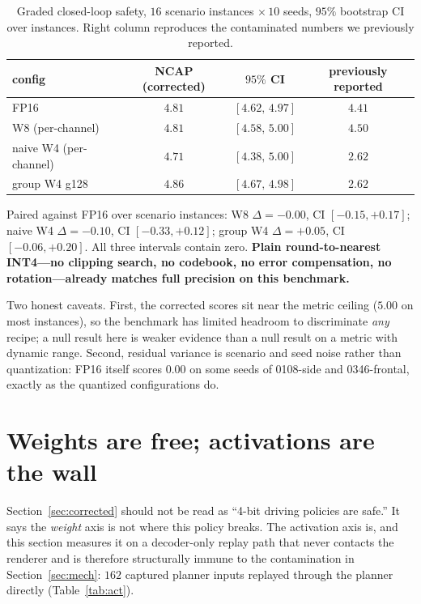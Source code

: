 \documentclass[conference]{IEEEtran}
\begin{document}
\begin{table}[t]\centering
\caption{Graded closed-loop safety, $16$ scenario instances $\times\,10$ seeds, $95\%$ bootstrap CI
over instances. Right column reproduces the contaminated numbers we previously reported.}
\label{tab:corrected}
\begin{tabular}{lccc}
\toprule
config & NCAP (corrected) & $95\%$ CI & previously reported \\
\midrule
FP16 & $4.81$ & $[4.62,\,4.97]$ & $4.41$ \\
W8 (per-channel) & $4.81$ & $[4.58,\,5.00]$ & $4.50$ \\
naive W4 (per-channel) & $\mathbf{4.71}$ & $[4.38,\,5.00]$ & $2.62$ \\
group W4 g128 & $\mathbf{4.86}$ & $[4.67,\,4.98]$ & $2.62$ \\
\bottomrule
\end{tabular}
\end{table}

Paired against FP16 over scenario instances: W8 $\Delta=-0.00$, CI $[-0.15,+0.17]$; naive W4
$\Delta=-0.10$, CI $[-0.33,+0.12]$; group W4 $\Delta=+0.05$, CI $[-0.06,+0.20]$. All three
intervals contain zero. \textbf{Plain round-to-nearest INT4---no clipping search, no codebook, no
error compensation, no rotation---already matches full precision on this benchmark.}

Two honest caveats. First, the corrected scores sit near the metric ceiling ($5.00$ on most
instances), so the benchmark has limited headroom to discriminate \emph{any} recipe; a null result
here is weaker evidence than a null result on a metric with dynamic range. Second, residual
variance is scenario and seed noise rather than quantization: FP16 itself scores $0.00$ on some
seeds of 0108-side and 0346-frontal, exactly as the quantized configurations do.

\section{Weights are free; activations are the wall}
\label{sec:activations}
Section~\ref{sec:corrected} should not be read as ``4-bit driving policies are safe.'' It says the
\emph{weight} axis is not where this policy breaks. The activation axis is, and this section
measures it on a decoder-only replay path that never contacts the renderer and is therefore
structurally immune to the contamination in Section~\ref{sec:mech}: $162$ captured planner inputs
replayed through the planner directly (Table~\ref{tab:act}).
\end{document}
